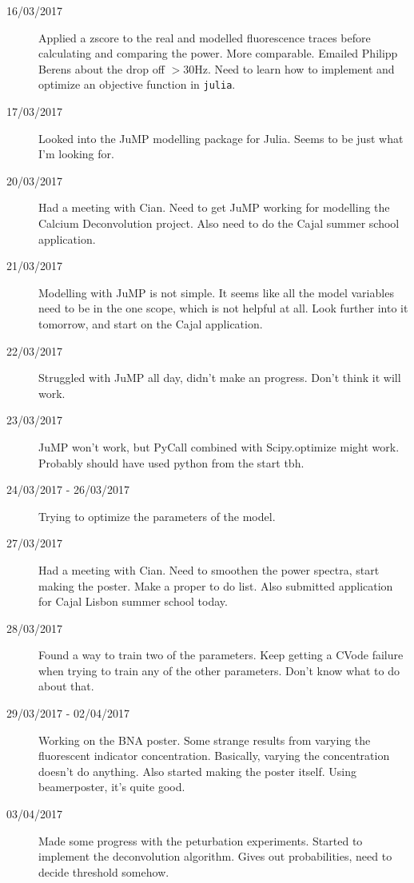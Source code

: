 \documentclass[a4paper,12pt]{article}
\theoremstyle{definition}
\begin{document}
\begin{description}
	\item[16/03/2017] Applied a zscore to the real and modelled fluorescence traces before calculating and comparing the power. More comparable. Emailed Philipp Berens about the drop off $> 30$Hz. Need to learn how to implement and optimize an objective function in \texttt{julia}.

	\item[17/03/2017] Looked into the JuMP modelling package for Julia. Seems to be just what I'm looking for.

	\item[20/03/2017] Had a meeting with Cian. Need to get JuMP working for modelling the Calcium Deconvolution project. Also need to do the Cajal summer school application.

	\item[21/03/2017] Modelling with JuMP is not simple. It seems like all the model variables need to be in the one scope, which is not helpful at all. Look further into it tomorrow, and start on the Cajal application.

	\item[22/03/2017] Struggled with JuMP all day, didn't make an progress. Don't think it will work.

	\item[23/03/2017] JuMP won't work, but PyCall combined with Scipy.optimize might work. Probably should have used python from the start tbh.

	\item[24/03/2017 - 26/03/2017] Trying to optimize the parameters of the model.

	\item[27/03/2017] Had a meeting with Cian. Need to smoothen the power spectra, start making the poster. Make a proper to do list. Also submitted application for Cajal Lisbon summer school today.

	\item[28/03/2017] Found a way to train two of the parameters. Keep getting a CVode failure when trying to train any of the other parameters. Don't know what to do about that.

	\item[29/03/2017 - 02/04/2017] Working on the BNA poster. Some strange results from varying the fluorescent indicator concentration. Basically, varying the concentration doesn't do anything. Also started making the poster itself. Using beamerposter, it's quite good.

	\item[03/04/2017] Made some progress with the peturbation experiments. Started to implement the deconvolution algorithm. Gives out probabilities, need to decide threshold somehow.


\end{description}
\end{document}
